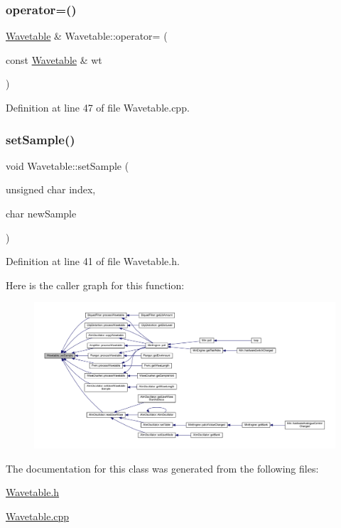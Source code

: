 \subsubsection{\texorpdfstring{operator=()}{operator=()}}
{\footnotesize\ttfamily \hyperlink{class_wavetable}{Wavetable} \& Wavetable\+::operator= (\begin{DoxyParamCaption}\item[{const \hyperlink{class_wavetable}{Wavetable} \&}]{wt }\end{DoxyParamCaption})}



Definition at line 47 of file Wavetable.\+cpp.

\mbox{\label{class_wavetable_a01485340698b4bf92f3065f31feaf4c4}} 
\subsubsection{\texorpdfstring{set\+Sample()}{setSample()}}
{\footnotesize\ttfamily void Wavetable\+::set\+Sample (\begin{DoxyParamCaption}\item[{unsigned char}]{index,  }\item[{char}]{new\+Sample }\end{DoxyParamCaption})\hspace{0.3cm}{\ttfamily [inline]}}



Definition at line 41 of file Wavetable.\+h.

Here is the caller graph for this function\+:
\nopagebreak
\begin{figure}[H]
\begin{center}
\leavevmode
\includegraphics[width=350pt]{d8/d3f/class_wavetable_a01485340698b4bf92f3065f31feaf4c4_icgraph}
\end{center}
\end{figure}


The documentation for this class was generated from the following files\+:\begin{DoxyCompactItemize}
\item 
\hyperlink{_wavetable_8h}{Wavetable.\+h}\item 
\hyperlink{_wavetable_8cpp}{Wavetable.\+cpp}\end{DoxyCompactItemize}
